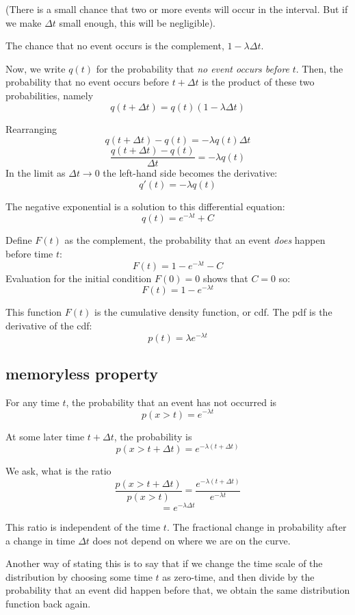\documentclass[11pt, oneside]{article}
\begin{document}
(There is a small chance that two or more events will occur in the interval.  But if we make $\Delta t$ small enough, this will be negligible).

The chance that no event occurs is the complement, $1 - \lambda \Delta t$.

Now, we write $q(t)$ for the probability that \emph{no event occurs before} $t$.  Then, the probability that no event occurs before $t + \Delta t$ is the product of these two probabilities, namely
\[ q(t + \Delta t) = q(t)(1 - \lambda \Delta t) \]

Rearranging
\[ q(t + \Delta t) - q(t) = - \lambda q(t) \Delta t \]
\[ \frac{q(t + \Delta t) - q(t)}{\Delta t} = - \lambda q(t) \]
In the limit as $\Delta t \rightarrow 0$ the left-hand side becomes the derivative:
\[ q'(t) = -  \lambda q(t) \]

The negative exponential is a solution to this differential equation:
\[ q(t) = e^{-\lambda t} + C \]

Define $F(t)$ as the complement, the probability that an event \emph{does} happen before time $t$:
\[ F(t) = 1 - e^{-\lambda t} - C \]
Evaluation for the initial condition $F(0) = 0$ shows that $C = 0$ so:
\[ F(t) = 1 - e^{-\lambda t} \]

This function $F(t)$ is the cumulative density function, or cdf.  The pdf is the derivative of the cdf:
\[ p(t) = \lambda e^{-\lambda t} \]

\subsection*{memoryless property}

For any time $t$, the probability that an event has not occurred is
\[ p(x > t) = e^{-\lambda t}  \]

At some later time $t + \Delta t$, the probability is
\[ p(x > t + \Delta t) = e^{-\lambda (t + \Delta t)}  \]

We ask, what is the ratio 
\[ \frac{ p(x > t + \Delta t) }{ p(x > t) } =  \frac{e^{-\lambda (t + \Delta t)} } {  e^{-\lambda t}} \]
\[ = e^{-\lambda \Delta t} \]

This ratio is independent of the time $t$.  The fractional change in probability after a change in time $\Delta t$ does not depend on where we are on the curve.

Another way of stating this is to say that if we change the time scale of the distribution by choosing some time $t$ as zero-time, and then divide by the probability that an event did happen before that, we obtain the same distribution function back again.
\end{document}
